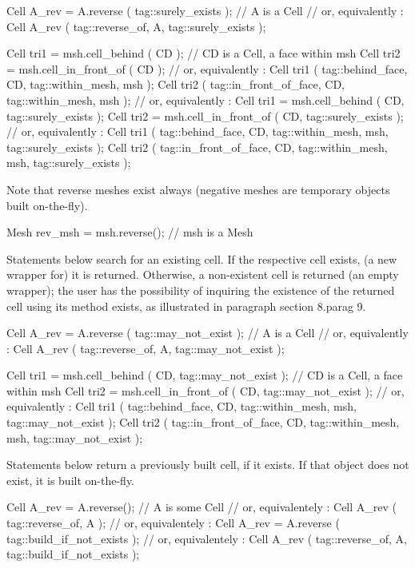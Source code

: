 {\verbatim
   Cell A_rev = A.reverse ( tag::surely_exists );  //  A is a Cell
   // or, equivalently :
   Cell A_rev ( tag::reverse_of, A, tag::surely_exists );

   Cell tri1 = msh.cell_behind ( CD );  //  CD is a Cell, a face within msh
   Cell tri2 = msh.cell_in_front_of ( CD );
   // or, equivalently :
   Cell tri1 ( tag::behind_face, CD, tag::within_mesh, msh );
   Cell tri2 ( tag::in_front_of_face, CD, tag::within_mesh, msh );
   // or, equivalently :
   Cell tri1 = msh.cell_behind ( CD, tag::surely_exists );
   Cell tri2 = msh.cell_in_front_of ( CD, tag::surely_exists );
   // or, equivalently :
   Cell tri1 ( tag::behind_face, CD, tag::within_mesh, msh, tag::surely_exists );
   Cell tri2 ( tag::in_front_of_face, CD,
               tag::within_mesh, msh, tag::surely_exists );
\endverbatim

Note that reverse meshes exist always (negative meshes are temporary objects built
on-the-fly).

\verbatim
   Mesh rev_msh = msh.reverse();  // msh is a Mesh
\endverbatim

Statements below search for an existing cell.
If the respective cell exists, (a new wrapper for) it is returned.
Otherwise, a non-existent cell is returned
(an empty wrapper); the user has the possibility of inquiring the existence
of the returned cell using its method {\codett exists}, as illustrated in paragraph
\numb section 8.\numb parag 9.

\verbatim
   Cell A_rev = A.reverse ( tag::may_not_exist );  //  A is a Cell
   // or, equivalently :
   Cell A_rev ( tag::reverse_of, A, tag::may_not_exist );
   
   Cell tri1 = msh.cell_behind ( CD, tag::may_not_exist );
   //  CD is a Cell, a face within msh
   Cell tri2 = msh.cell_in_front_of ( CD, tag::may_not_exist );
   // or, equivalently :
   Cell tri1 ( tag::behind_face, CD, tag::within_mesh, msh, tag::may_not_exist );
   Cell tri2
      ( tag::in_front_of_face, CD, tag::within_mesh, msh, tag::may_not_exist );
\endverbatim

Statements below return a previously built cell, if it exists.
If that object does not exist, it is built on-the-fly.

\verbatim
   Cell A_rev = A.reverse();  // A is some Cell
   // or, equivalentely :
   Cell A_rev ( tag::reverse_of, A );
   // or, equivalentely :
   Cell A_rev = A.reverse ( tag::build_if_not_exists );
   // or, equivalentely :
   Cell A_rev ( tag::reverse_of, A, tag::build_if_not_exists );
\endverbatim

}
